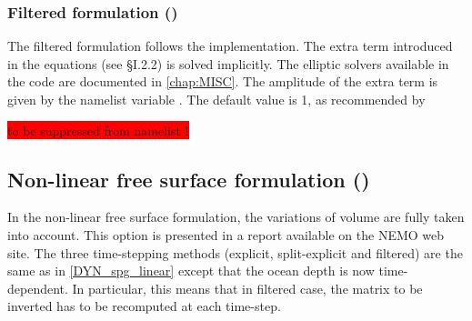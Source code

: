 \documentclass[../tex_main/NEMO_manual]{subfiles}
\begin{document}
\subsubsection{Filtered formulation (\protect{})}
\label{subsec:DYN_spg_flt}

The filtered formulation follows the \citet{Roullet2000} implementation. The extra term introduced in the equations (see {\S}I.2.2) is solved implicitly. The elliptic solvers available in the code are 
documented in \autoref{chap:MISC}. The amplitude of the extra term is given by the namelist variable . The default value is 1, as recommended by \citet{Roullet2000}

\colorbox{red}{ to be suppressed from namelist !}

\subsection{Non-linear free surface formulation (\protect{})}
\label{subsec:DYN_spg_vvl}

In the non-linear free surface formulation, the variations of volume are fully taken into account. This option is presented in a report \citep{Levier2007} available on the NEMO web site. The three time-stepping methods (explicit, split-explicit and filtered) are the same as in \autoref{DYN_spg_linear} except that the ocean depth is now time-dependent. In particular, this means that in filtered case, the matrix to be inverted has to be recomputed at each time-step.
\end{document}
